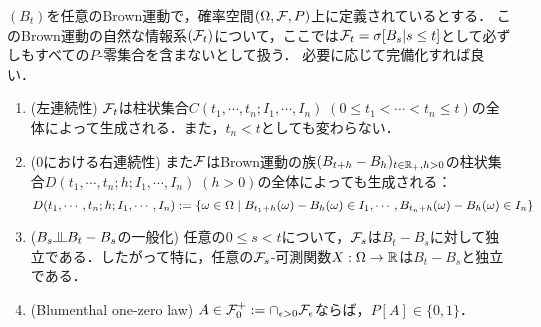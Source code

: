 \documentclass[uplatex,dvipdfmx]{jsreport}
\begin{document}
\begin{lemma}[自然な情報系の特徴付け]\label{lemma-Blumenthal}
    $(B_t)$を任意のBrown運動で，確率空間$(\Omega,\mathcal{F},P)$上に定義されているとする．
    このBrown運動の自然な情報系$(\mathcal{F}_t)$について，ここでは$\mathcal{F}_t=\sigma[B_s|s\le t]$として必ずしもすべての$P$-零集合を含まないとして扱う．
    必要に応じて完備化すれば良い．
    \begin{enumerate}
        \item (左連続性) $\mathcal{F}_t$は柱状集合$C(t_1,\cdots,t_n;I_1,\cdots,I_n)\;(0\le t_1<\cdots<t_n\le t)$の全体によって生成される．また，$t_n<t$としても変わらない．
        \item ($0$における右連続性) また$\mathcal{F}$はBrown運動の族$(B_{t+h}-B_h)_{t\in\mathbb{R}_+,h>0}$の柱状集合$D(t_1,\cdots,t_n;h;I_1,\cdots,I_n)\;(h>0)$の全体によっても生成される：
        \[D(t_1,\cdots,t_n;h;I_1,\cdots,I_n):=\left\{\omega\in\Omega\mid B_{t_1+h}(\omega)-B_{h}(\omega)\in I_1,\cdots,B_{t_n+h}(\omega)-B_h(\omega)\in I_n\right\}\]
        \item ($B_s\indep B_t-B_s$の一般化) 任意の$0\le s<t$について，$\mathcal{F}_s$は$B_t-B_s$に対して独立である．したがって特に，任意の$\mathcal{F}_s$-可測関数$X:\Omega\to\mathbb{R}$は$B_t-B_s$と独立である．
        \item (Blumenthal one-zero law) $A\in\mathcal{F}_0^+:=\cap_{\epsilon>0}\mathcal{F}_\epsilon$ならば，$P[A]\in\{0,1\}$．
    \end{enumerate}
\end{lemma}
\end{document}
